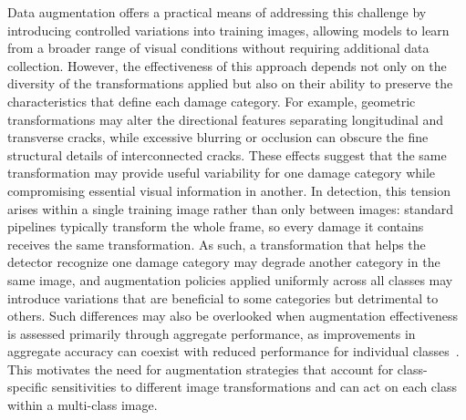 \documentclass[conference]{IEEEtran}
\begin{document}
Data augmentation offers a practical means of addressing this challenge by introducing controlled variations into training images, allowing models to learn from a broader range of visual conditions without requiring additional data collection. However, the effectiveness of this approach depends not only on the diversity of the transformations applied but also on their ability to preserve the characteristics that define each damage category. For example, geometric transformations may alter the directional features separating longitudinal and transverse cracks, while excessive blurring or occlusion can obscure the fine structural details of interconnected cracks. These effects suggest that the same transformation may provide useful variability for one damage category while compromising essential visual information in another. In detection, this tension arises within a single training image rather than only between images: standard pipelines typically transform the whole frame, so every damage it contains receives the same transformation. As such, a transformation that helps the detector recognize one damage category may degrade another category in the same image, and augmentation policies applied uniformly across all classes may introduce variations that are beneficial to some categories but detrimental to others. Such differences may also be overlooked when augmentation effectiveness is assessed primarily through aggregate performance, as improvements in aggregate accuracy can coexist with reduced performance for individual classes~\cite{kirichenko2023}. This motivates the need for augmentation strategies that account for class-specific sensitivities to different image transformations and can act on each class within a multi-class image.
\end{document}
